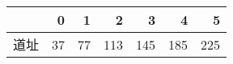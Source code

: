 \begin{tabular}{lrrrrrr}
\toprule
{} &   0 &   1 &    2 &    3 &    4 &    5 \\
\midrule
道址 &  37 &  77 &  113 &  145 &  185 &  225 \\
\bottomrule
\end{tabular}

